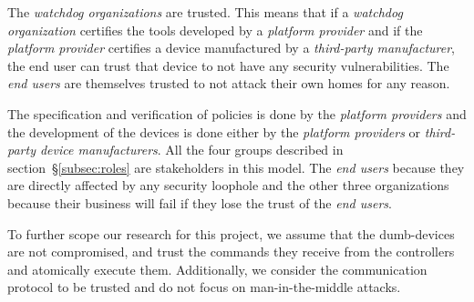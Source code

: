 \documentclass{article}
\begin{document}
The \textit{watchdog organizations} are trusted. This means that if a \textit{watchdog organization} certifies the tools developed by a \textit{platform provider} and if the \textit{platform provider} certifies a device manufactured by a \textit{third-party manufacturer}, the end user can trust that device to not have any security vulnerabilities.
The \textit{end users} are themselves trusted to not attack their own homes for any reason. 

The specification and verification of policies is done by the \textit{platform providers} and the development of the devices is done either by the \textit{platform providers} or \textit{third-party device manufacturers}. All the four groups described in section~\S\ref{subsec:roles} are stakeholders in this model. The \textit{end users} because they are directly affected by any security loophole and the other three organizations because their business will fail if they lose the trust of the \textit{end users}.

To further scope our research for this project, we assume that the dumb-devices are not compromised, and trust the commands they receive from the controllers and atomically execute them. Additionally, we consider the communication protocol to be trusted and do not focus on man-in-the-middle attacks.
\end{document}
